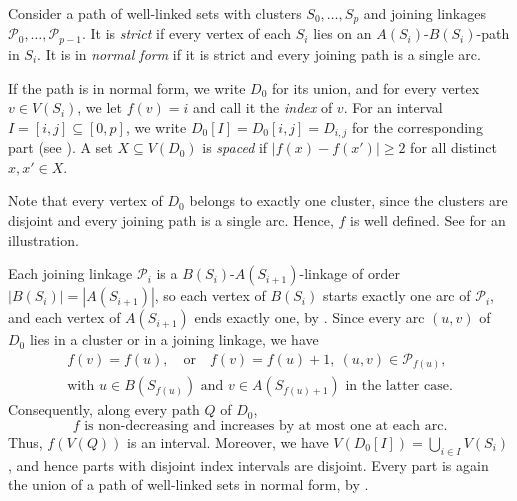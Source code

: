 \documentclass[fontsize=12pt,leading=14pt]{fullpaper}
\newcommand{\Pcal}{\mathcal{P}}
\begin{document}
\begin{definition}\label{def:normal-form}
  Consider a path of well-linked sets with clusters $S_0,\dots,S_p$ and joining linkages $\Pcal_0,\dots,\Pcal_{p-1}$.
  It is \emph{strict} if every vertex of each $S_i$ lies on an $A(S_i)$-$B(S_i)$-path in $S_i$.
  It is in \emph{normal form} if it is strict and every joining path is a single arc.

  If the path is in normal form, we write $D_0$ for its union, and for every vertex $v\in V(S_i)$, we let $f(v)=i$ and call it the \emph{index} of $v$.
  For an interval $I=[i,j]\subseteq[0,p]$, we write $D_0[I]=D_0[i,j]=D_{i,j}$ for the corresponding part (see ).
  A set $X\subseteq V(D_0)$ is \emph{spaced} if $|f(x)-f(x')|\ge2$ for all distinct $x,x'\in X$.
\end{definition}

Note that every vertex of $D_0$ belongs to exactly one cluster, since the clusters are disjoint and every joining path is a single arc.
Hence, $f$ is well defined.
See  for an illustration.

Each joining linkage $\Pcal_i$ is a $B(S_i)$-$A(S_{i+1})$-linkage of order $|B(S_i)|=|A(S_{i+1})|$, so each vertex of $B(S_i)$ starts exactly one arc of $\Pcal_i$, and each vertex of $A(S_{i+1})$ ends exactly one, by .
Since every arc $(u,v)$ of $D_0$ lies in a cluster or in a joining linkage, we have
\[
  \begin{gathered}
    f(v)=f(u),\quad\text{or}\quad
    f(v)=f(u)+1,\ (u,v)\in\Pcal_{f(u)},\\
    \text{with }u\in B(S_{f(u)})\text{ and }v\in A(S_{f(u)+1})\text{ in the latter case.}
  \end{gathered}
\]
Consequently, along every path $Q$ of $D_0$,
\begin{equation}\label{eq:stage2-monotone}
  f\text{ is non-decreasing and increases by at most one at each arc.}
\end{equation}
Thus, $f(V(Q))$ is an interval.
Moreover, we have $V(D_0[I])=\bigcup_{i\in I}V(S_i)$, and hence parts with disjoint index intervals are disjoint.
Every part is again the union of a path of well-linked sets in normal form, by .
\end{document}

